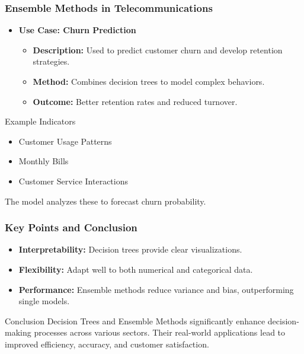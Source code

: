\documentclass{beamer}
\begin{document}
\begin{frame}[fragile]
    \frametitle{Ensemble Methods in Telecommunications}
    \begin{itemize}
        \item \textbf{Use Case: Churn Prediction}
        \begin{itemize}
            \item \textbf{Description:} Used to predict customer churn and develop retention strategies.
            \item \textbf{Method:} Combines decision trees to model complex behaviors.
            \item \textbf{Outcome:} Better retention rates and reduced turnover.
        \end{itemize}
    \end{itemize}

    \begin{block}{Example Indicators}
        \begin{itemize}
            \item Customer Usage Patterns
            \item Monthly Bills
            \item Customer Service Interactions
        \end{itemize}
        The model analyzes these to forecast churn probability.
    \end{block}
\end{frame}

\begin{frame}
    \frametitle{Key Points and Conclusion}
    \begin{itemize}
        \item \textbf{Interpretability:} Decision trees provide clear visualizations.
        \item \textbf{Flexibility:} Adapt well to both numerical and categorical data.
        \item \textbf{Performance:} Ensemble methods reduce variance and bias, outperforming single models.
    \end{itemize}

    \begin{block}{Conclusion}
        Decision Trees and Ensemble Methods significantly enhance decision-making processes across various sectors. Their real-world applications lead to improved efficiency, accuracy, and customer satisfaction.
    \end{block}
\end{frame}
\end{document}
